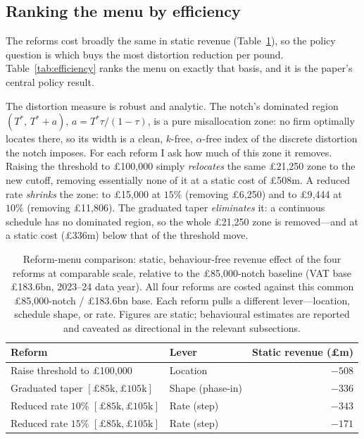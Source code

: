 \subsection{Ranking the menu by efficiency}
\label{sec:results_efficiency}

The reforms cost broadly the same in static revenue (Table~\ref{tab:reform_menu}),
so the policy question is which buys the most distortion reduction per pound.
Table~\ref{tab:efficiency} ranks the menu on exactly that basis, and it is the
paper's central policy result.

The distortion measure is robust and analytic. The notch's dominated region
$(T^{*},\,T^{*}+a)$, $a=T^{*}\tau/(1-\tau)$, is a pure misallocation zone: no firm
optimally locates there, so its width is a clean, $k$-free,
$\alpha$-free index of the discrete distortion the notch imposes. For each reform
I ask how much of this zone it removes. Raising the threshold to \pounds100{,}000
simply \emph{relocates} the same \pounds21{,}250 zone to the new cutoff, removing
essentially none of it at a static cost of \pounds508m. A reduced rate
\emph{shrinks} the zone: to \pounds15{,}000 at $15\%$ (removing \pounds6{,}250)
and to \pounds9{,}444 at $10\%$ (removing \pounds11{,}806). The graduated taper
\emph{eliminates} it: a continuous schedule has no dominated region, so the whole
\pounds21{,}250 zone is removed---and at a static cost (\pounds336m) below that of
the threshold move.

\begin{table}[htbp]
\centering
\caption{Reform-menu comparison: static, behaviour-free revenue effect of the four
reforms at comparable scale, relative to the \pounds85{,}000-notch baseline (VAT
base \pounds183.6bn, 2023--24 data year). All four reforms are costed against
this common \pounds85{,}000-notch / \pounds183.6bn base. Each reform pulls a different lever---location,
schedule shape, or rate. Figures are static; behavioural estimates are reported
and caveated as directional in the relevant subsections.}
\label{tab:reform_menu}
\begin{tabular}{llr}
\toprule
Reform & Lever & Static revenue (\pounds m) \\
\midrule
Raise threshold to \pounds100{,}000 & Location & $-508$ \\
Graduated taper $[\pounds85\text{k},\pounds105\text{k}]$ & Shape (phase-in) & $-336$ \\
Reduced rate $10\%$ $[\pounds85\text{k},\pounds105\text{k}]$ & Rate (step) & $-343$ \\
Reduced rate $15\%$ $[\pounds85\text{k},\pounds105\text{k}]$ & Rate (step) & $-171$ \\
\bottomrule
\end{tabular}
\end{table}

